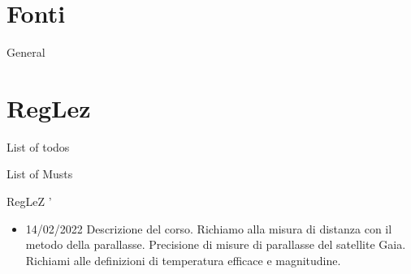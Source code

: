 \section{Fonti}

\begin{wordonframe}{General}
\end{wordonframe}


\section{RegLez }

\begin{frame}[allowframebreaks]{List of todos}
\end{frame}


\begin{frame}[allowframebreaks]{List of Musts}
\end{frame}

\begin{frame}[allowframebreaks]{RegLeZ '}
\begin{itemize}
\item 14/02/2022 Descrizione del corso. Richiamo alla misura di distanza con il metodo della parallasse. Precisione di misure di parallasse del satellite Gaia. Richiami alle definizioni di temperatura efficace e magnitudine.
\end{itemize}
\end{frame}